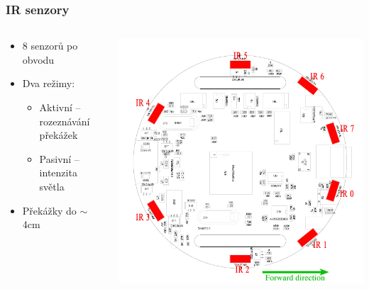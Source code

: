 \documentclass{beamer}
\begin{document}
\begin{frame}
    \frametitle{IR senzory}
    \begin{columns}
        \begin{column}{0.6\textwidth}
            \begin{itemize}
                \item 8 senzorů po obvodu
                \item Dva režimy:
                    \begin{itemize}
                        \item Aktivní -- rozeznávání překážek
                        \item Pasivní -- intenzita světla
                    \end{itemize}
                \item Překážky do $\sim$ 4cm
            \end{itemize}
        \end{column}

        \begin{column}{0.4\textwidth}
            \includegraphics[scale=0.2]{proximity_emplacement.png}
        \end{column}
    \end{columns}
\end{frame}
\end{document}
